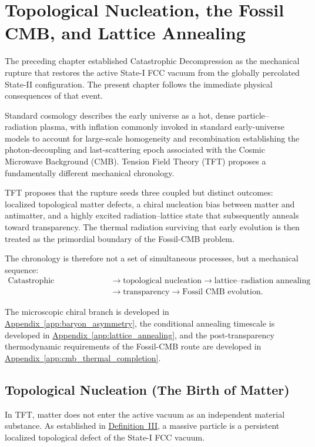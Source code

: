 \chapter{Topological Nucleation, the Fossil CMB, and Lattice Annealing}
\label{chap:nucleation_annealing}

The preceding chapter established Catastrophic Decompression as the mechanical rupture that restores the active State-I FCC vacuum from the globally percolated State-II configuration. The present chapter follows the immediate physical consequences of that event.

Standard cosmology describes the early universe as a hot, dense particle--radiation plasma, with inflation commonly invoked in standard early-universe models to account for large-scale homogeneity and recombination establishing the photon-decoupling and last-scattering epoch associated with the Cosmic Microwave Background (CMB). Tension Field Theory (TFT) proposes a fundamentally different mechanical chronology.

TFT proposes that the rupture seeds three coupled but distinct outcomes: localized topological matter defects, a chiral nucleation bias between matter and antimatter, and a highly excited radiation--lattice state that subsequently anneals toward transparency. The thermal radiation surviving that early evolution is then treated as the primordial boundary of the Fossil-CMB problem.

The chronology is therefore not a set of simultaneous processes, but a mechanical sequence:
\begin{equation}
\begin{aligned}
    \text{Catastrophic Decompression} 
    &\longrightarrow \text{topological nucleation} 
    \longrightarrow \text{lattice--radiation annealing} \\
    &\longrightarrow \text{transparency} 
    \longrightarrow \text{Fossil CMB evolution}.
\end{aligned}
\end{equation}

The microscopic chiral branch is developed in \hyperref[app:baryon_asymmetry]{Appendix~\ref*{app:baryon_asymmetry}}, the conditional annealing timescale is developed in \hyperref[app:lattice_annealing]{Appendix~\ref*{app:lattice_annealing}}, and the post-transparency thermodynamic requirements of the Fossil-CMB route are developed in \hyperref[app:cmb_thermal_completion]{Appendix~\ref*{app:cmb_thermal_completion}}.


\section{Topological Nucleation (The Birth of Matter)}
\label{sec:topological_nucleation}
In TFT, matter does not enter the active vacuum as an independent material substance. As established in \hyperref[def:definition_three]{Definition~III}, a massive particle is a persistent localized topological defect of the State-I FCC vacuum.

